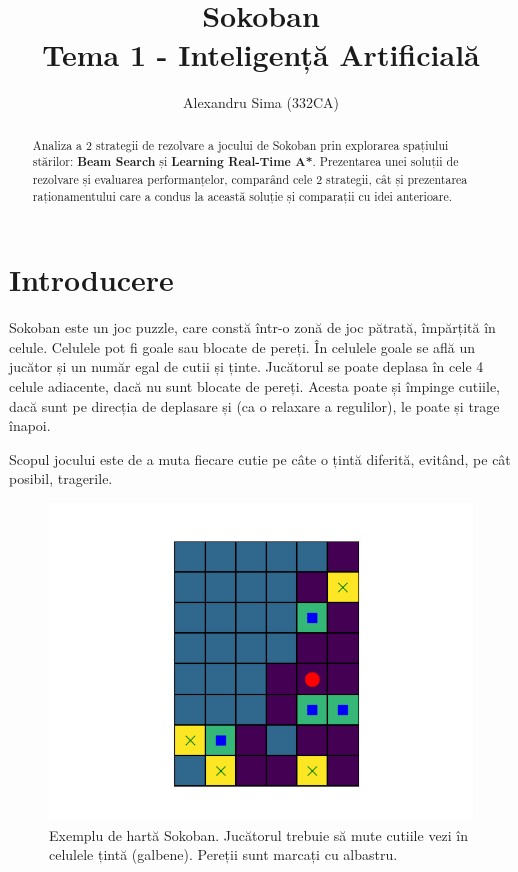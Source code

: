 \documentclass{article}
\title{{\huge Sokoban}\\Tema 1 - Inteligență Artificială}
\author{Alexandru Sima (332CA)}
\begin{document}
\maketitle
\begin{abstract}
    Analiza a 2 strategii de rezolvare a jocului de Sokoban prin explorarea 
    spațiului stărilor: \textbf{Beam Search} și \textbf{Learning Real-Time A*}. 
    Prezentarea unei soluții de rezolvare și evaluarea performanțelor, comparând
    cele 2 strategii, cât și prezentarea raționamentului care a condus la 
    această soluție și comparații cu idei anterioare.
\end{abstract}

\pagestyle{fancy}

\newpage
\tableofcontents

\newpage
\section{Introducere}
Sokoban este un joc puzzle, care constă într-o zonă de joc pătrată, împărțită în
celule. Celulele pot fi goale sau blocate de pereți. În celulele goale se află 
un jucător și un număr egal de cutii și ținte. Jucătorul se poate deplasa în 
cele 4 celule adiacente, dacă nu sunt blocate de pereți. Acesta poate și împinge
cutiile, dacă sunt pe direcția de deplasare și (ca o relaxare a regulilor), le 
poate și trage înapoi.

Scopul jocului este de a muta fiecare cutie pe câte o țintă diferită, evitând, 
pe cât posibil, tragerile.

\begin{figure}[ht]
    \begin{center}
        \includegraphics[scale=0.7]{hard_map1.png}
    \end{center}
    \caption{Exemplu de hartă Sokoban. Jucătorul trebuie să mute cutiile vezi 
    în celulele țintă (galbene). Pereții sunt marcați cu albastru.}
    \label{fig:sokoban}
\end{figure}
\end{document}
